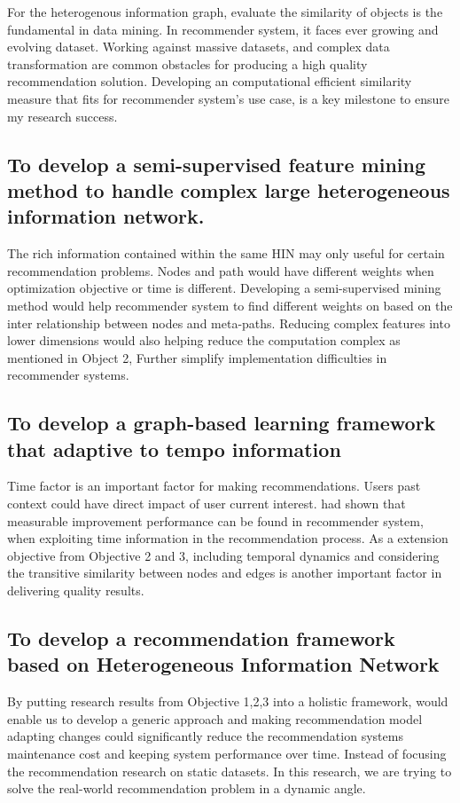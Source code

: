 \documentclass[12pt,a4 paper,title page]{article}
\theoremstyle{definition}
\begin{document}
For the heterogenous information graph, evaluate the similarity of objects is the fundamental in data mining. In recommender system, it faces ever growing and evolving dataset. Working against massive datasets, and complex data transformation are common obstacles for producing a high quality recommendation solution. Developing an computational efficient similarity measure that fits for recommender system's use case, is a key milestone to ensure my research success.

\subsection{To develop a semi-supervised feature mining method to handle complex large heterogeneous information network.}

The rich information contained within the same HIN may only useful for certain recommendation problems. Nodes and path would have different weights when optimization objective or time is different. Developing a semi-supervised mining method would help recommender system to find different weights on based on the inter relationship between nodes and meta-paths. Reducing complex features into lower dimensions would also helping reduce the computation complex \citep{Cai2018} as mentioned in Object 2, Further simplify implementation difficulties in recommender systems. 

\subsection{To develop a graph-based learning framework that adaptive to tempo information}

Time factor is an important factor for making recommendations. Users past context could have direct impact of user current interest. \citet{Song2019} had shown that measurable improvement performance can be found in recommender system, when exploiting time information in the recommendation process. As a extension objective from Objective 2 and 3, including temporal dynamics and considering the transitive similarity between nodes and edges is another important factor in delivering quality results.

\subsection{To develop a recommendation framework based on Heterogeneous Information Network} 

By putting research results from Objective 1,2,3 into a holistic framework, would enable us to develop a generic approach and making recommendation model adapting changes could significantly reduce the recommendation systems maintenance cost and keeping system performance over time. 
Instead of focusing the recommendation research on static datasets. In this research, we are trying to solve the real-world recommendation problem in a dynamic angle.
\end{document}
